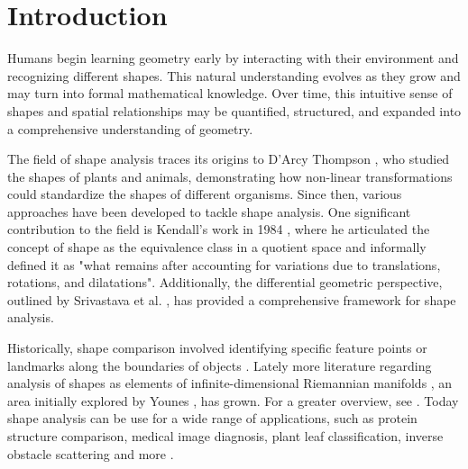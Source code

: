 \chapter{Introduction}
\label{ch:introduction}


Humans begin learning geometry early by interacting with their environment and recognizing different shapes. This natural understanding evolves as they grow and may turn into formal mathematical knowledge. Over time, this intuitive sense of shapes and spatial relationships may be quantified, structured, and expanded into a comprehensive understanding of geometry.

The field of shape analysis traces its origins to D'Arcy Thompson \cite{thompsonGrowthFormProject}, who studied the shapes of plants and animals, demonstrating how non-linear transformations could standardize the shapes of different organisms. Since then, various approaches have been developed to tackle shape analysis. One significant contribution to the field is Kendall's work in 1984 \cite{kendallShapeManifoldsProcrustean1984}, where he articulated the concept of shape as the equivalence class in a quotient space and informally defined it as "what remains after accounting for variations due to translations, rotations, and dilatations". Additionally, the differential geometric perspective, outlined by Srivastava et al. \cite{srivastavaAdvancesDifferentialgeometricApproaches2012}, has provided a comprehensive framework for shape analysis.


Historically, shape comparison involved identifying specific feature points or landmarks along the boundaries of objects \cite{kendallShapeManifoldsProcrustean1984}. Lately more literature regarding analysis of shapes as elements of infinite-dimensional Riemannian manifolds \cite{srivastavaShapeAnalysisElastic2011}, an area initially explored by Younes \cite{younesComputableElasticDistances1998}, has grown. For a greater overview, see \cite{bauerOverviewGeometriesShape2014, srivastavaFunctionalShapeData2016}. Today shape analysis can be use for a wide range of applications, such as protein structure comparison, medical image diagnosis, plant leaf classification, inverse obstacle scattering and more \cite{liuMathematicalFrameworkProtein2011, eckhardtElasticEnergyRegularization2019, lagaLandmarkfreeStatisticalAnalysis2014, glaunesLargeDeformationDiffeomorphic2008}.

